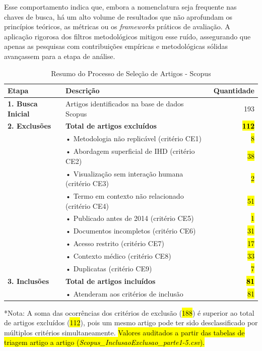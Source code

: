 \documentclass[
	12pt,				%
	oneside,			%
	a4paper,			%
	english,			%
	brazil				%
	]{abntex2ppgsi}
\begin{document}
    Esse comportamento indica que, embora a nomenclatura seja frequente nas chaves de busca, há um alto volume de resultados que não aprofundam os princípios teóricos, as métricas ou os \textit{frameworks} práticos de avaliação. A aplicação rigorosa dos filtros metodológicos mitigou esse ruído, assegurando que apenas as pesquisas com contribuições empíricas e metodológicas sólidas avançassem para a etapa de análise.
    \clearpage
    

\begin{table}[h]
\centering
\caption{Resumo do Processo de Seleção de Artigos - Scopus}
\label{tab:resumo_selecao_Scopus}
\begin{tabularx}{\textwidth}{lXr}
\toprule
\textbf{Etapa} & \textbf{Descrição} & \textbf{Quantidade} \\
\midrule
\textbf{1. Busca Inicial} & Artigos identificados na base de dados Scopus & 193 \\
\midrule
\textbf{2. Exclusões} & \textbf{Total de artigos excluídos} & \hl{\textbf{112}} \\
& \hspace{0.5cm}• Metodologia não replicável (critério CE1) & \hl{8} \\
& \hspace{0.5cm}• Abordagem superficial de IHD (critério CE2) & \hl{38} \\
& \hspace{0.5cm}• Visualização sem interação humana (critério CE3) & \hl{2} \\
& \hspace{0.5cm}• Termo em contexto não relacionado (critério CE4) & \hl{51} \\
& \hspace{0.5cm}• Publicado antes de 2014 (critério CE5) & \hl{1} \\
& \hspace{0.5cm}• Documentos incompletos (critério CE6) & \hl{31} \\
& \hspace{0.5cm}• Acesso restrito (critério CE7) & \hl{17} \\
& \hspace{0.5cm}• Contexto médico (critério CE8) & \hl{33} \\
& \hspace{0.5cm}• Duplicatas (critério CE9) & \hl{7} \\
\midrule
\textbf{3. Inclusões} & \textbf{Total de artigos incluídos} & \hl{\textbf{81}} \\
& \hspace{0.5cm}• Atenderam aos critérios de inclusão & \hl{81} \\
\bottomrule
\end{tabularx}
\vspace{0.2cm}
\footnotesize{*Nota: A soma das ocorrências dos critérios de exclusão (\hl{188}) é superior ao total de artigos excluídos (\hl{112}), pois um mesmo artigo pode ter sido desclassificado por múltiplos critérios simultaneamente. \hl{Valores auditados a partir das tabelas de triagem artigo a artigo (\textit{Scopus\_InclusaoExclusao\_parte1-5.csv}).}}
\end{table}
\end{document}
